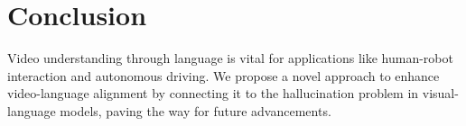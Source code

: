 \section{Conclusion}

Video understanding through language is vital for applications like human-robot interaction and autonomous driving. We propose a novel approach to enhance video-language alignment by connecting it to the hallucination problem in visual-language models, paving the way for future advancements.
